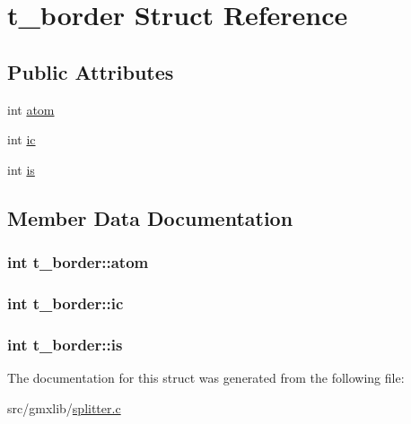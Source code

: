 \hypertarget{structt__border}{\section{t\-\_\-border \-Struct \-Reference}
\label{structt__border}
}
\subsection*{\-Public \-Attributes}
\begin{DoxyCompactItemize}
\item 
int \hyperlink{structt__border_a90fdf3eea1666a09b2670ce173d782c1}{atom}
\item 
int \hyperlink{structt__border_a8a1f6f9d85edc1c269914a64f0817d57}{ic}
\item 
int \hyperlink{structt__border_aab5c4784a75ffd807692f712c071ea40}{is}
\end{DoxyCompactItemize}


\subsection{\-Member \-Data \-Documentation}
\hypertarget{structt__border_a90fdf3eea1666a09b2670ce173d782c1}{
\subsubsection[{atom}]{\setlength{\rightskip}{0pt plus 5cm}int {\bf t\-\_\-border\-::atom}}}\label{structt__border_a90fdf3eea1666a09b2670ce173d782c1}
\hypertarget{structt__border_a8a1f6f9d85edc1c269914a64f0817d57}{
\subsubsection[{ic}]{\setlength{\rightskip}{0pt plus 5cm}int {\bf t\-\_\-border\-::ic}}}\label{structt__border_a8a1f6f9d85edc1c269914a64f0817d57}
\hypertarget{structt__border_aab5c4784a75ffd807692f712c071ea40}{
\subsubsection[{is}]{\setlength{\rightskip}{0pt plus 5cm}int {\bf t\-\_\-border\-::is}}}\label{structt__border_aab5c4784a75ffd807692f712c071ea40}


\-The documentation for this struct was generated from the following file\-:\begin{DoxyCompactItemize}
\item 
src/gmxlib/\hyperlink{splitter_8c}{splitter.\-c}\end{DoxyCompactItemize}
